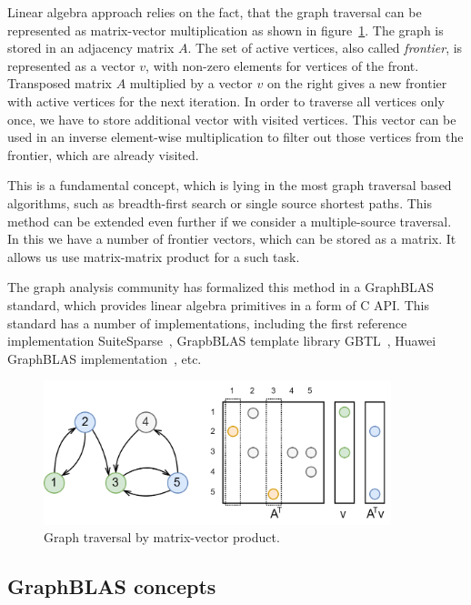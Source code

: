 Linear algebra approach relies on the fact, that the graph traversal can be represented as matrix-vector multiplication as shown in figure~\ref{fig:gt_mxv}. The graph is stored in an adjacency matrix $A$. The set of active vertices, also called \textit{frontier}, is represented as a vector $v$, with non-zero elements for vertices of the front. Transposed matrix $A$ multiplied by a vector $v$ on the right gives a new frontier with active vertices for the next iteration. In order to traverse all vertices only once, we have to store additional vector with visited vertices. This vector can be used in an inverse element-wise multiplication to filter out those vertices from the frontier, which are already visited. 

This is a fundamental concept, which is lying in the most graph traversal based algorithms, such as breadth-first search or single source shortest paths. This method can be extended even further if we consider a multiple-source traversal. In this we have a number of frontier vectors, which can be stored as a matrix. It allows us use matrix-matrix product for a such task.

The graph analysis community has formalized this method in a GraphBLAS~\cite{paper:graphblas_foundations} standard, which provides linear algebra primitives in a form of C API. This standard has a number of implementations, including the first reference implementation SuiteSparse~\cite{article:suite_sparse_for_graph_problems}, GrapbBLAS template library GBTL~\cite{article:gbtl}, Huawei GraphBLAS implementation~\cite{article:hu_graphblas_impl}, etc.

\begin{figure}[h]
    \centering
    \includegraphics[width=0.9\textwidth]{images/graph_traversal_mxv.png}
    \caption{Graph traversal by matrix-vector product.}
    \label{fig:gt_mxv}
\end{figure}

\subsection{GraphBLAS concepts}


